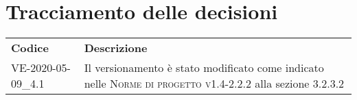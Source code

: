 \documentclass{article}
\begin{document}
\paragraph*{}


\section{Tracciamento delle decisioni}
\begin{table}[H]
  \centering
  \begin{tabular}{p{4cm}|p{12cm}}
    \rowcolor{lightgray}
    \textbf{Codice}  & \textbf{Descrizione}      \\
    VE-2020-05-09\_4.1 & Il versionamento è stato modificato come indicato nelle \textsc{Norme di progetto v1.4-2.2.2} alla sezione 3.2.3.2 \\
  \end{tabular}
\end{table}
\end{document}
